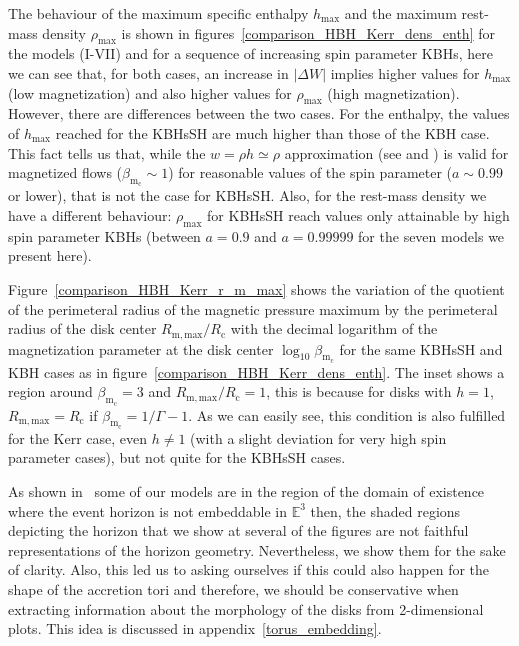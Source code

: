\documentclass[twocolumn,aps,showpacs,showkeys,prd,superscriptaddress,byrevtex, amsmath]{revtex4-1}
\begin{document}
The behaviour of the maximum specific enthalpy $h_{\mathrm{max}}$ and the maximum rest-mass density $\rho_{\mathrm{max}}$ is shown in figures~\ref{comparison_HBH_Kerr_dens_enth} for the models (I-VII) and for a sequence of increasing spin parameter KBHs, here we can see that, for both cases, an increase in $|\Delta W|$ implies higher values for $h_{\mathrm{max}}$ (low magnetization) and also higher values for $\rho_{\mathrm{max}}$ (high magnetization). However, there are differences between the two cases. For the enthalpy, the values of $h_{\mathrm{max}}$ reached for the KBHsSH are much higher than those of the KBH case. This fact tells us that, while the $w = \rho h \simeq \rho$ approximation (see \cite{Komissarov:2006} and \cite{Gimeno-Soler:2017}) is valid for magnetized flows ($\beta_{\mathrm{m_c}} \sim 1$) for reasonable values of the spin parameter ($a \sim 0.99$ or lower), that is not the case for KBHsSH. Also, for the rest-mass density we have a different behaviour: $\rho_{\mathrm{max}}$ for KBHsSH reach values only attainable by high spin parameter KBHs (between $a = 0.9$ and $a = 0.99999$ for the seven models we present here).

Figure~\ref{comparison_HBH_Kerr_r_m_max} shows the variation of the quotient of the perimeteral radius of the magnetic pressure maximum by the perimeteral radius of the disk center $R_{\mathrm{m, max}}/R_{\mathrm{c}}$ with the decimal logarithm of the magnetization parameter at the disk center $\log_{10} \beta_{\mathrm{m_c}}$ for the same KBHsSH and KBH cases as in figure~\ref{comparison_HBH_Kerr_dens_enth}. The inset shows a region around $\beta_{\mathrm{m_c}} = 3$ and $R_{\mathrm{m, max}}/R_{\mathrm{c}} = 1$, this is because for disks with $h = 1$, $R_{\mathrm{m, max}} = R_{\mathrm{c}}$ if $\beta_{\mathrm{m_c}} = 1 / \Gamma - 1$. As we can easily see, this condition is also fulfilled for the Kerr case, even $h \neq 1$ (with a slight deviation for very high spin parameter cases), but not quite for the KBHsSH cases.


As shown in~\cite{Delgado:2018} some  of our models are in the region of the domain of existence where the event horizon is not embeddable in $\mathbb{E}^3$ then, the shaded regions depicting the horizon that we show at several of the figures are not faithful representations of the horizon geometry. Nevertheless, we show them for the sake of clarity. Also, this led us to asking ourselves if this could also happen for the shape of the accretion tori and therefore, we should be conservative when extracting information about the morphology of the disks from 2-dimensional plots. This idea is discussed in appendix~\ref{torus_embedding}.
\end{document}
